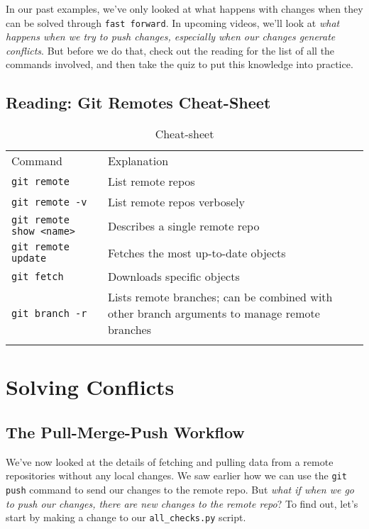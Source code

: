 	In our past examples, we've only looked at what happens with changes when they can be solved through \verb|fast forward|. In upcoming videos, we'll look at \textit{what happens when we try to push changes, especially when our changes generate conflicts}. 
	But before we do that, check out the reading for the list of all the commands involved, and then take the quiz to put this knowledge into practice.

	\subsection{Reading: Git Remotes Cheat-Sheet} \label{W302e}

	\begin{table}
		\caption{Cheat-sheet}
		\label{tab:W302e}       %
		\begin{tabular}{p{4cm}p{7.5cm}}
			\hline\noalign{\smallskip}
			Command & Explanation \\
			\noalign{\smallskip}\svhline\noalign{\smallskip}
			\verb|git remote| & List remote repos \\
			\verb|git remote -v| & List remote repos verbosely\\
			\verb|git remote show <name>| & Describes a single remote repo \\
			\verb|git remote update| & Fetches the most up-to-date objects \\
			\verb|git fetch| & Downloads specific objects \\		
			\verb|git branch -r| & Lists remote branches; can be combined with other branch arguments to manage remote branches \\
			\noalign{\smallskip}\hline\noalign{\smallskip}
		\end{tabular}
	\end{table}



\section{Solving Conflicts} \label{W303}

	\subsection{The Pull-Merge-Push Workflow} \label{W303a}

	We've now looked at the details of fetching and pulling data from a remote repositories without any local changes. We saw earlier how we can use the \verb|git push| command to send our changes to the remote repo. But \textit{what if when we go to push our changes, there are new changes to the remote repo}? To find out, let's start by making a change to our \verb|all_checks.py| script.
	
